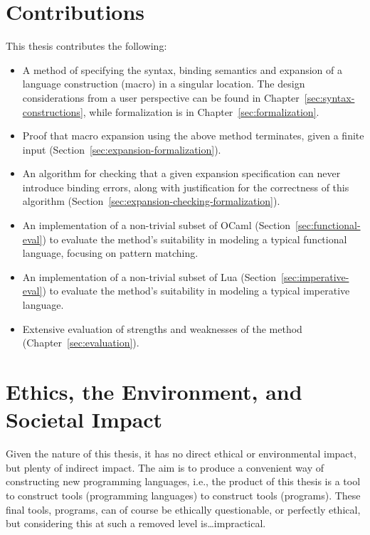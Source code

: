 \documentclass{kththesis}
\begin{document}
\section{Contributions} \label{sec:contributions}

This thesis contributes the following:

\begin{itemize}
  \item A method of specifying the syntax, binding semantics and expansion of a language construction (macro) in a singular location. The design considerations from a user perspective can be found in Chapter~\ref{sec:syntax-constructions}, while formalization is in Chapter~\ref{sec:formalization}.
  \item Proof that macro expansion using the above method terminates, given a finite input (Section~\ref{sec:expansion-formalization}).
  \item An algorithm for checking that a given expansion specification can never introduce binding errors, along with justification for the correctness of this algorithm (Section~\ref{sec:expansion-checking-formalization}).
  \item An implementation of a non-trivial subset of OCaml (Section~\ref{sec:functional-eval}) to evaluate the method's suitability in modeling a typical functional language, focusing on pattern matching.
  \item An implementation of a non-trivial subset of Lua (Section~\ref{sec:imperative-eval}) to evaluate the method's suitability in modeling a typical imperative language.
  \item Extensive evaluation of strengths and weaknesses of the method (Chapter~\ref{sec:evaluation}).
\end{itemize}

\section{Ethics, the Environment, and Societal Impact}

Given the nature of this thesis, it has no direct ethical or environmental impact, but plenty of indirect impact. The aim is to produce a convenient way of constructing new programming languages, i.e., the product of this thesis is a tool to construct tools (programming languages) to construct tools (programs). These final tools, programs, can of course be ethically questionable, or perfectly ethical, but considering this at such a removed level is\ldots impractical.
\end{document}

